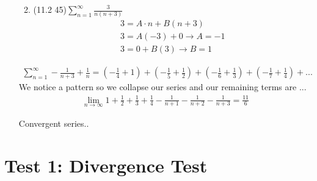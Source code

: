 \documentclass[12pt]{article}
\begin{document}
\begin{enumerate}
\begin{enumerate}
\begin{equation*}
            \end{equation*}
            \item (11.2 45)$\sum_{n=1}^\infty\frac{3}{n(n+3)}$
                \begin{align*}
                    3=A\cdot n+B(n+3)
                    \\3=A(-3)+0 \to A=-1
                    \\3=0+B(3) \to B=1
                \end{align*}
        \end{enumerate}
        \begin{align*}
        \sum_{n=1}^\infty -\frac{1}{n+3}+\frac{1}{n}=
        \left(-\frac{1}{4} + 1\right) + \left(-\frac{1}{5} + \frac{1}{2}\right)
        +\left(-\frac{1}{6} + \frac{1}{3}\right)+\left(-\frac{1}{7} +
        \frac{1}{4}\right)+ ...
        \end{align*}
        We notice a pattern so we collapse our series and our remaining terms are ...
        \begin{align*}
            \lim_{n\to\infty}1+\frac{1}{2}+\frac{1}{3}+\frac{1}{4}-\frac{1}{n+1}-\frac{1}{n+2}
            -\frac{1}{n+3}=\frac{11}{6}
        \end{align*}
       \begin{center}
           Convergent series..
       \end{center}
    \end{enumerate}
\newpage\section{Test 1: Divergence Test}
\end{document}
